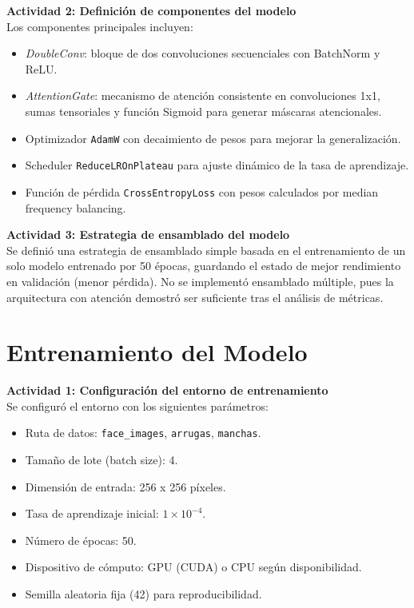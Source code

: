 \textbf{Actividad 2: Definición de componentes del modelo}\\
Los componentes principales incluyen:
\begin{itemize}
  \item \textit{DoubleConv}: bloque de dos convoluciones secuenciales con BatchNorm y ReLU.  
  \item \textit{AttentionGate}: mecanismo de atención consistente en convoluciones 1x1, sumas tensoriales y función Sigmoid para generar máscaras atencionales.  
  \item Optimizador \texttt{AdamW} con decaimiento de pesos para mejorar la generalización.  
  \item Scheduler \texttt{ReduceLROnPlateau} para ajuste dinámico de la tasa de aprendizaje.  
  \item Función de pérdida \texttt{CrossEntropyLoss} con pesos calculados por median frequency balancing.  
\end{itemize}

\textbf{Actividad 3: Estrategia de ensamblado del modelo}\\
Se definió una estrategia de ensamblado simple basada en el entrenamiento de un solo modelo entrenado por 50 épocas, guardando el estado de mejor rendimiento en validación (menor pérdida). No se implementó ensamblado múltiple, pues la arquitectura con atención demostró ser suficiente tras el análisis de métricas.

\section{Entrenamiento del Modelo}

\textbf{Actividad 1: Configuración del entorno de entrenamiento}\\
Se configuró el entorno con los siguientes parámetros:
\begin{itemize}
  \item Ruta de datos: \texttt{face\_images}, \texttt{arrugas}, \texttt{manchas}.  
  \item Tamaño de lote (batch size): 4.  
  \item Dimensión de entrada: 256 x 256 píxeles.  
  \item Tasa de aprendizaje inicial: $1\times10^{-4}$.  
  \item Número de épocas: 50.  
  \item Dispositivo de cómputo: GPU (CUDA) o CPU según disponibilidad.  
  \item Semilla aleatoria fija (42) para reproducibilidad.  
\end{itemize}

